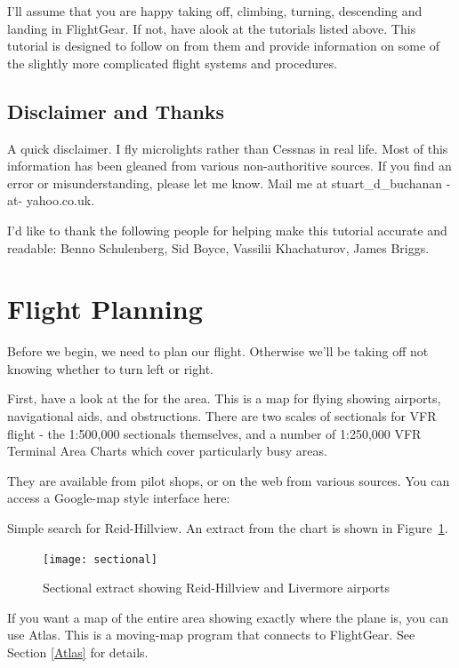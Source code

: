 I'll assume that you are happy taking off, climbing, turning, descending 
and landing in FlightGear. If not, have alook at the tutorials listed above. 
This tutorial is designed to follow on from them and provide information on 
some of the slightly more complicated flight systems and procedures.

\subsection{Disclaimer and Thanks}

A quick disclaimer. I fly microlights rather than Cessnas in real life. Most of 
this information has been gleaned from various non-authoritive sources. If you 
find an error or misunderstanding, please let me know. Mail me at 
stuart\_d\_buchanan -at- yahoo.co.uk.

I'd like to thank the following people for helping make this tutorial accurate 
and readable: Benno Schulenberg, Sid Boyce, Vassilii Khachaturov, James Briggs.

\section{Flight Planning}

Before we begin, we need to plan our flight. 
Otherwise we'll be taking off not knowing whether to turn left or right.

First, have a look at the  for the area. This is a map for 
flying showing airports, navigational aids, and obstructions. 
There are two scales of sectionals for VFR flight - 
the 1:500,000 sectionals themselves, and a number of 
1:250,000 VFR Terminal Area Charts which cover particularly busy areas.

They are available from pilot shops, or on the web from various sources. 
You can access a Google-map style interface here:

\medskip
{}
\medskip

Simple search for Reid-Hillview. An extract from the chart is shown in Figure~\ref{sectional}.

\begin{figure}[!htp]
\centering
\texttt{[image: sectional]}
\caption{Sectional extract showing Reid-Hillview and Livermore airports\label{sectional}}
\end{figure}

If you want a map of the entire area showing exactly where the plane is, 
you can use Atlas. 
This is a moving-map program that connects to FlightGear. See Section \ref{Atlas} for details.

